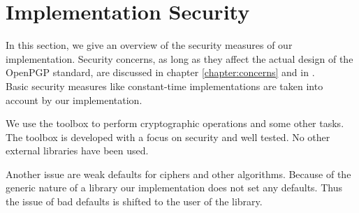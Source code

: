 \newpage

\section{Implementation Security}
In this section, we give an overview of the security measures of our implementation. 
Security concerns, as long as they affect the actual design of the OpenPGP standard, are discussed in chapter \ref{chapter:concerns} and in \cite[section 14]{RFC4880}.  \\

Basic security measures like constant-time implementations are taken into account by our implementation. 

We use the  toolbox to perform cryptographic operations and some other tasks. The toolbox is developed with a focus on security and well tested. No other external libraries have been used. 

Another issue are weak defaults for ciphers and other algorithms. Because of the generic nature of a library our implementation does not set any defaults. Thus the issue of bad defaults is shifted to the user of the library. \\







